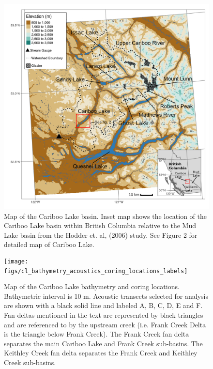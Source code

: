 \documentclass[Royal,times,doublespace,sageh]{sagej}
\begin{document}
\begin{figure}

{\centering \includegraphics[width=1\linewidth]{figs/cl_small_scale_inset_labels_gimp} 

}

\caption{Map of the Cariboo Lake basin. Inset map shows the location of the Cariboo Lake basin within British Columbia relative to the Mud Lake basin from the Hodder et. al, (2006) study. See Figure 2 for detailed map of Cariboo Lake.}\label{fig:map-basin}
\end{figure}

\begin{figure}

{\centering \texttt{[image: figs/cl\_bathymetry\_acoustics\_coring\_locations\_labels]} 

}

\caption{Map of the Cariboo Lake bathymetry and coring locations. Bathymetric interval is 10 m. Acoustic transects selected for analysis are shown with a black solid line and labeled A, B, C, D, E and F. Fan deltas mentioned in the text are represented by black triangles and are referenced to by the upstream creek (i.e. Frank Creek Delta is the triangle below Frank Creek). The Frank Creek fan delta separates the main Cariboo Lake and Frank Creek sub-basins. The Keithley Creek fan delta separates the Frank Creek and Keithley Creek sub-basins.}\label{fig:map-lake}
\end{figure}
\end{document}
